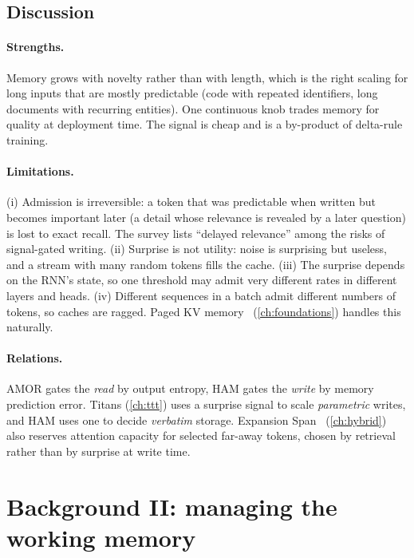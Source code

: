 \subsection{Discussion}

\paragraph{Strengths.} Memory grows with novelty rather than with length, which is the right scaling
for long inputs that are mostly predictable (code with repeated identifiers, long documents with
recurring entities). One continuous knob trades memory for quality at deployment time. The signal is
cheap and is a by-product of delta-rule training.

\paragraph{Limitations.} (i) Admission is irreversible: a token that was predictable when written but
becomes important later (a detail whose relevance is revealed by a later question) is lost to exact
recall. The survey lists ``delayed relevance'' among the risks of signal-gated writing. (ii) Surprise is
not utility: noise is surprising but useless, and a stream with many random tokens fills the cache.
(iii) The surprise depends on the RNN's state, so one threshold may admit very different rates in
different layers and heads. (iv) Different sequences in a batch admit different numbers of tokens, so
caches are ragged. Paged KV memory~\citep{kwon2023paged} (\cref{ch:foundations}) handles this naturally.

\paragraph{Relations.} AMOR gates the \emph{read} by output entropy, HAM gates the \emph{write} by
memory prediction error. Titans (\cref{ch:ttt}) uses a surprise signal to scale \emph{parametric}
writes, and HAM uses one to decide \emph{verbatim} storage. Expansion Span~\citep{nunez2025expansion}
(\cref{ch:hybrid}) also reserves attention capacity for selected far-away tokens, chosen by retrieval
rather than by surprise at write time.

\section{Background II: managing the working memory}\label{sec:c13-mgmt-bg}

